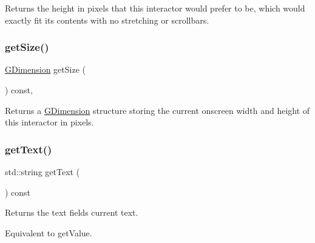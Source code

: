 Returns the height in pixels that this interactor would prefer to be, which would exactly fit its contents with no stretching or scrollbars. 

\mbox{\label{classsgl_1_1GInteractor_a7b4eec96a2bdc6420695d5796a78eea9}} 
\subsubsection{\texorpdfstring{get\+Size()}{getSize()}}
{\footnotesize\ttfamily \mbox{\hyperlink{structsgl_1_1GDimension}{G\+Dimension}} get\+Size (\begin{DoxyParamCaption}{ }\end{DoxyParamCaption}) const\hspace{0.3cm}{\ttfamily [virtual]}, {\ttfamily [inherited]}}



Returns a \mbox{\hyperlink{structsgl_1_1GDimension}{G\+Dimension}} structure storing the current onscreen width and height of this interactor in pixels. 

\mbox{\label{classsgl_1_1GTextField_aff553c50924b836c29f146ed34a7c6ec}} 
\subsubsection{\texorpdfstring{get\+Text()}{getText()}}
{\footnotesize\ttfamily std\+::string get\+Text (\begin{DoxyParamCaption}{ }\end{DoxyParamCaption}) const\hspace{0.3cm}{\ttfamily [virtual]}}



Returns the text field\textquotesingle{}s current text. 

Equivalent to get\+Value. \mbox{\label{classsgl_1_1GTextField_a9b72ede4ee8520f987a0c01e30654814}} 
